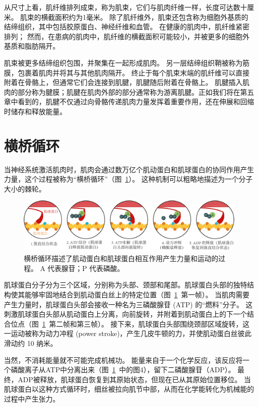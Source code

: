 从尺寸上看，肌纤维排列成束，称为肌束，它们与肌肉纤维一样，长度可达数十厘米。
肌束的横截面积约为1毫米。
除了肌纤维外，肌束还包含称为细胞外基质的结缔组织，其中包括胶原蛋白、神经纤维和血管。
在健康的肌肉中，肌纤维紧密排列；
然而，在患病的肌肉中，肌纤维的横截面积可能较小，并被更多的细胞外基质和脂肪隔开。


肌束被更多结缔组织包围，并聚集在一起形成肌肉。
另一层结缔组织鞘被称为筋膜，包裹着肌肉并将其与其他肌肉隔开。
终止于每个肌束末端的肌纤维可以直接附着在骨骼上，但通常它们会连接到肌腱，肌腱随后附着在骨骼上。
肌腱插入肌肉的部分称为腱膜；肌腱在肌肉外部的部分通常称为游离肌腱。正如我们将在第五章中看到的，肌腱不仅通过向骨骼传递肌肉力量发挥着重要作用，还在伸展和回缩时储存和释放能量。


\section{横桥循环}

当神经系统激活肌肉时，肌肉会通过数万亿个肌动蛋白和肌球蛋白的协同作用产生力量，这个过程被称为“横桥循环”（图~\ref{fig:4_3}）。
这种机制可以粗略地描述为一个分子大小的棘轮。


\begin{figure}[!htb]
	\centering
	\includegraphics[width=1.0\linewidth]{chap4/4_3}
	\caption{横桥循环描述了肌动蛋白和肌球蛋白相互作用产生力量和运动的过程。
		A 代表腺苷；P 代表磷酸。 \label{fig:4_3}}
\end{figure}

肌球蛋白分子分为三个区域，分别称为头部、颈部和尾部。肌球蛋白头部的独特结构使其能够牢固地结合到肌动蛋白丝上的特定位置（图~\ref{fig:4_3}~第一帧）。
当肌肉需要产生力量时，肌球蛋白头部会接收一种名为三磷酸腺苷 (ATP) 的“燃料”分子。
这刺激肌球蛋白头部从肌动蛋白上分离，向前旋转，并附着到肌动蛋白上的下一个结合位点（图~\ref{fig:4_3}~第二帧和第三帧）。
接下来，肌球蛋白头部围绕颈部区域旋转，这一运动被称为动力冲程 (power stroke)，产生几皮牛顿的力，并使肌动蛋白丝彼此滑动约 10 纳米。


当然，不消耗能量就不可能完成机械功。
能量来自于一个化学反应，该反应将一个磷酸离子从ATP中分离出来（图~\ref{fig:4_3}~中的图4），留下二磷酸腺苷（ADP）。
最终，ADP被释放，肌球蛋白恢复到其原始状态，但现在已从其原始位置移位。
当肌球蛋白以这种方式循环时，细丝被拉向肌节中部，从而在化学能转化为机械能的过程中产生张力。


